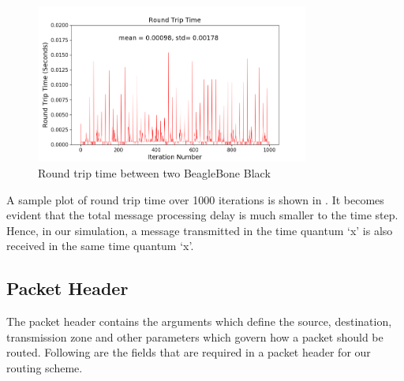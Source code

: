 \begin{figure}[hbtp]
\centering
\includegraphics[width=0.8\textwidth]{Chapter-4/figs/transmission_time}
\caption{Round trip time between two BeagleBone Black}
\label{fig:proc_delay_graph}
\end{figure}

A sample plot of round trip time over 1000 iterations is shown in . It becomes evident that the total message processing delay is much smaller to the time step. Hence, in our simulation, a message transmitted in the time quantum `x' is also received in the same time quantum `x'.

\subsection{Packet Header} \label{packet_header}
The packet header contains the arguments which define the source, destination, transmission zone and other parameters which govern how a packet should be routed. Following are the fields that are required in a packet header for our routing scheme.

